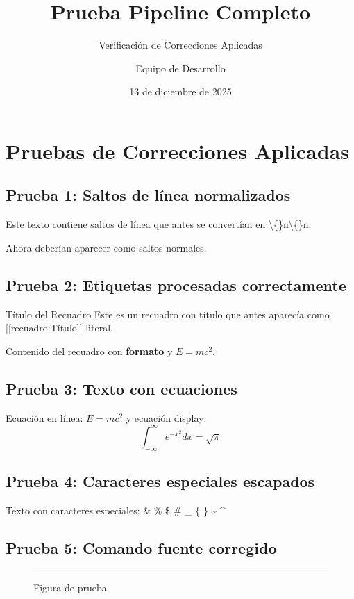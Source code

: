 \documentclass{sener2025}
\title{Prueba Pipeline Completo}
\subtitle{Verificación de Correcciones Aplicadas}
\author{Equipo de Desarrollo}
\date{13 de diciembre de 2025}
\begin{document}
\portadafondo

\tableofcontents
\newpage

\section{Pruebas de Correcciones Aplicadas}

\subsection{Prueba 1: Saltos de línea normalizados}

Este texto contiene saltos de línea que antes se convertían en \textbackslash\{\}n\textbackslash\{\}n.

Ahora deberían aparecer como saltos normales.

\subsection{Prueba 2: Etiquetas procesadas correctamente}

\begin{recuadro}{Título del Recuadro}
Este es un recuadro con título que antes aparecía como [[recuadro:Título]] literal.

Contenido del recuadro con \textbf{formato} y $E=mc^2$.
\end{recuadro}

\subsection{Prueba 3: Texto con ecuaciones}

Ecuación en línea: $E=mc^2$ y ecuación display:
$$\int_{-\infty}^{\infty} e^{-x^2} dx = \sqrt{\pi}$$

\subsection{Prueba 4: Caracteres especiales escapados}

Texto con caracteres especiales: \& \% \$ \# \_ \{ \} \textasciitilde{} \textasciicircum{}

\subsection{Prueba 5: Comando fuente corregido}

\begin{figure}[H]
  \centering
  \rule{5cm}{3cm}
  \caption{Figura de prueba}
\end{figure}
\end{document}
